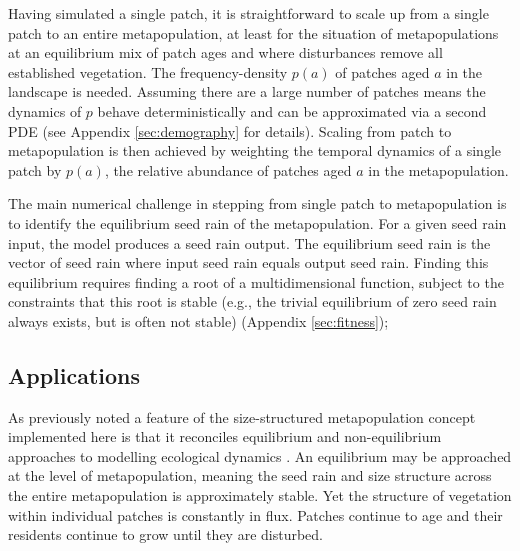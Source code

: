 \documentclass[a4paper,11pt]{article}
\begin{document}
Having simulated a single patch, it is straightforward to scale up from
a single patch to an entire metapopulation, at least for the situation
of metapopulations at an equilibrium mix of patch ages and where
disturbances remove all established vegetation. The frequency-density
\(p(a)\) of patches aged \(a\) in the landscape is needed. Assuming there
are a large number of patches means the dynamics of \(p\) behave
deterministically and can be approximated via a second PDE
\citep{Vonfoerster-1959, Mckendrick-1926} (see Appendix
\ref{sec:demography} for
details). Scaling from patch to metapopulation is then achieved by
weighting the temporal dynamics of a single patch by \(p(a)\), the
relative abundance of patches aged \(a\) in the metapopulation.

The main numerical challenge in stepping from single patch
to metapopulation is to identify the equilibrium seed rain of the
metapopulation. For a given seed rain input, the model produces a seed rain output. 
The equilibrium seed rain is the vector of seed rain
where input seed rain equals output seed rain. Finding this equilibrium
requires finding a root of a multidimensional function, subject to the
constraints that this root is stable (e.g., the trivial equilibrium of
zero seed rain always exists, but is often not stable) (Appendix \ref{sec:fitness});

\subsection{Applications}

As previously noted \citep{Kohyama-1993, Moorcroft-2001, Falster-2011} a
feature of the size-structured metapopulation concept implemented here
is that it reconciles equilibrium and non-equilibrium approaches to
modelling ecological dynamics
\citep{Levin-1974, Bormann-1979, Connell-1978, Coomes-2007}. An
equilibrium may be approached at the level of metapopulation, meaning
the seed rain and size structure across the entire metapopulation is
approximately stable. Yet the structure of vegetation within individual
patches is constantly in flux. Patches continue to age and their
residents continue to grow until they are disturbed.
\end{document}
